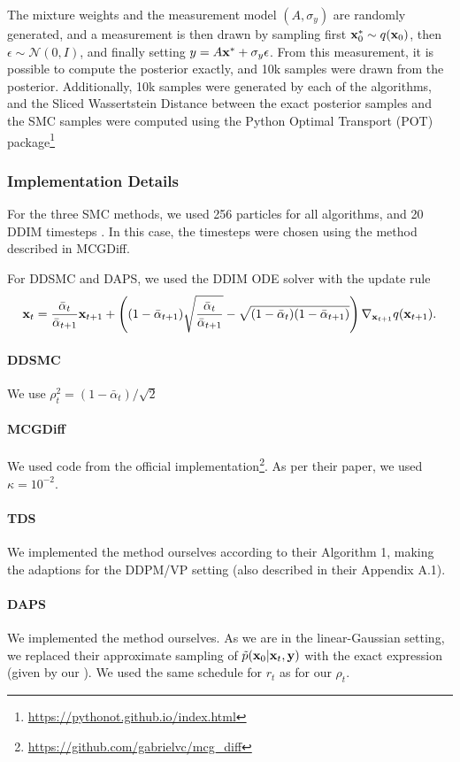 The mixture weights and the measurement model $(A, \sigma_y)$ are randomly generated, and a measurement is then drawn by sampling first $\mathbf{x}_0^* \sim q(\mathbf{x}_0)$, then $\epsilon\sim \mathcal{N}(0, I)$, and finally setting $y=A\mathbf{x}^* + \sigma_y\epsilon$. From this measurement, it is possible to compute the posterior exactly, and 10k samples were drawn from the posterior. Additionally, 10k samples were generated by each of the algorithms, and the Sliced Wassertstein Distance between the exact posterior samples and the SMC samples were computed using the Python Optimal Transport (POT) package\footnote{\url{https://pythonot.github.io/index.html}} \cite{flamary_pot_2021}

\subsubsection{Implementation Details}
For the three SMC methods, we used 256 particles for all algorithms, and 20 DDIM timesteps \cite{song_denoising_2021}. In this case, the timesteps were chosen using the method described in MCGDiff. 

For DDSMC and DAPS, we used the DDIM ODE solver with the update rule
\begin{align}
    \mathbf{x}_{t} = \frac{\bar \alpha_{t}}{\bar \alpha_{t+1}}\mathbf{x}_{t+1} + \left(
    (1-\bar \alpha_{t+1})\sqrt{\frac{\bar \alpha_{t}}{\bar \alpha_{t+1}}} - \sqrt{(1-\bar \alpha_{t})(1-\bar \alpha_{t+1})}
    \right)\nabla_{\mathbf{x}_{t+1}}q(\mathbf{x}_{t+1}). \label{eq:ddim_ode}
\end{align}

\paragraph{DDSMC}
We use $\rho_t^2 = (1-\bar \alpha_t)/\sqrt{2}$

\paragraph{MCGDiff}
We used code from the official implementation\footnote{\url{https://github.com/gabrielvc/mcg_diff}}. As per their paper, we used $\kappa=10^{-2}$. 

\paragraph{TDS}
We implemented the method ourselves according to their Algorithm 1, making the adaptions for the DDPM/VP setting (also described in their Appendix A.1).
\paragraph{DAPS}
We implemented the method ourselves. As we are in the linear-Gaussian setting, we replaced their approximate sampling of $\tilde p(\mathbf{x}_0|\mathbf{x}_{t}, \mathbf{y})$ with the exact expression (given by our ). We used the same schedule for $r_t$ as for our $\rho_t$. 

